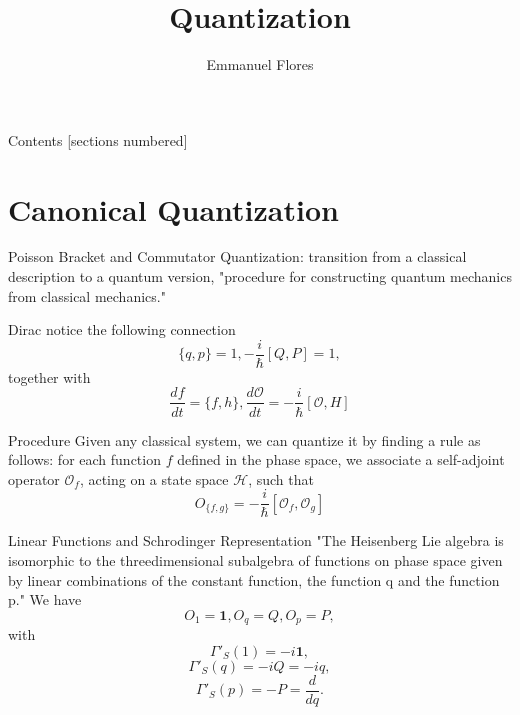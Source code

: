\documentclass[12pt]{beamer}
\title{Quantization}
\author{Emmanuel Flores}
\institute{Advanced Mathematical Methods, \\Tufts University}
\begin{document}
\maketitle
\begin{frame}{Contents}
	[sections numbered]
	\tableofcontents
\end{frame}
\section[Canonical Quantization]{Canonical Quantization}
\begin{frame}{Poisson Bracket and Commutator}
Quantization: transition from a classical description to a quantum version, "procedure for constructing quantum mechanics from classical mechanics."

Dirac notice the following connection
\begin{displaymath}
  \{q,p\}=1, -\frac{i}{\hbar}\left[Q,P\right] = 1,
\end{displaymath}
together with 
\begin{displaymath}
  \frac{df}{dt} = \{f, h\}, \frac{d\mathcal{O}}{dt}=-\frac{i}{\hbar}\left[\mathcal{O}, H\right]
\end{displaymath}
\end{frame}

\begin{frame}{Procedure}
Given any classical system, we can quantize it by finding a rule as follows: for each function $f$ defined in the phase space, we associate a self-adjoint operator $\mathcal{O}_{f}$, acting on a state space $\mathcal{H}$, such that 
\begin{displaymath}
  O_{\{f,g\}} = -\frac{i}{\hbar}\left[ \mathcal{O}_f, \mathcal{O}_g\right]
\end{displaymath}
\end{frame}

\begin{frame}{Linear Functions and Schrodinger Representation}
"The Heisenberg Lie algebra is isomorphic to the threedimensional subalgebra of functions on phase space given by linear combinations of the constant function, the function q and the function p."
We have
\begin{displaymath}
  O_1 = \mathbf{1}, O_q = Q, O_p = P,
\end{displaymath}
with
\begin{displaymath}
  \Gamma'_{S}(1)=-i\mathbf{1},
\end{displaymath}
\begin{displaymath}
  \Gamma'_{S}(q) = -iQ = -iq,
\end{displaymath}
\begin{displaymath}
    \Gamma'_{S}(p) = -P=\frac{d}{dq}.
\end{displaymath}
\end{frame}
\end{document}
